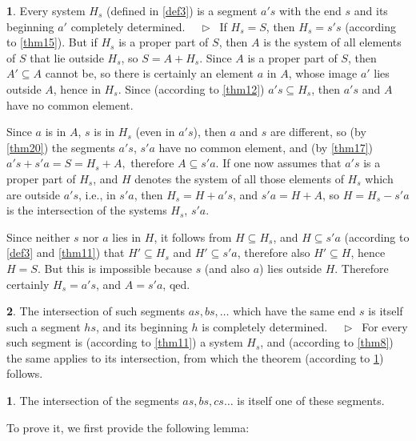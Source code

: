 \documentclass[leqno,hidelinks]{article}
\theoremstyle{definition}
\newtheorem{satz}{\protect\satzname}
\newtheorem*{zusatz}{\protect\zusatzname}
\newcommand{\satzname}{}
\newcommand{\zusatzname}{}
\renewcommand{\satzname}{\hspace{-4pt}.\ Satz}%
\renewcommand{\zusatzname}{Zusatz}%
\renewcommand{\satzname}{\hspace{-4pt}.\ Theorem}%
\renewcommand{\zusatzname}{Corollary}%
\newcommand\Beweis{\medskip \newline $ \phantom{'.'} \rhd \ $}%
\newcommand{\partof}{\subseteq}
\newcommand{\sref}[1]{\underline{\ref{#1}}}%
\begin{document}
\begin{paracol}{2}
\begin{satz}\label{thm27}
Every system $H_s$ (defined in \sref{def3}) is a segment $a's$ with the end $s$
and its beginning $a'$ completely determined.
\Beweis
If $H_s= S$, then $H_s= s's$ (according to \sref{thm15}).
But if $H_s$ is a proper part of $S$, then $A$ is the system of all elements
of $S$ that lie outside $H_s$, so $S=A+H_s$. Since $A$ is a proper part of $S$,
then $A' \partof A$ cannot be, so there is certainly an element $a$ in $A$, whose
image $a'$ lies outside $A$, hence in $H_s$. Since (according to \sref{thm12})
$a's \partof H_s$, then $a's$ and $A$ have no common element.

Since $a$ is in $A$, $s$ is in $H_s$ (even in $a's$), then $a$ and $s$ are
different, so (by \sref{thm20}) the segments $a's$, $s'a$ have no common element,
and (by \sref{thm17}) $a's+  s'a=S=H_s+ A,$ therefore $A \partof s'a$.
If one now assumes that $a's$ is a proper part of $H_s$, and $H$ denotes the
system of all those elements of $H_s$ which are outside $a's$, i.e., in $s'a$,
then $H_s = H+a's$, and $s'a = H + A$, so $H=H_s-s'a$ is the intersection of the
systems $H_s$, $s'a$.

Since neither $s$ nor $a$ lies in $H$, it follows from $H \partof H_s$, and
$H \partof s'a$ (according to \sref{def3} and \sref{thm11}) that $H' \partof H_s$
and $H' \partof s'a$, therefore also $H' \partof H$, hence $H = S$. But this is
impossible because $s$ (and also $a$) lies outside $H$. Therefore certainly
$H_s = a's$, and $A = s'a$, qed.
\end{satz}

\newpage

\begin{satz}\label{thm28}
The intersection of such segments $as, bs, \ldots$ which have the same end $s$ is
itself such a segment $hs$, and its beginning $h$ is completely determined.
\Beweis
For every such segment is (according to \sref{thm11}) a system $H_s$, and
(according to \sref{thm8}) the same applies to its intersection, from which the
theorem (according to \sref{thm27}) follows.
\end{satz}

\begin{zusatz} \label{cor_to_thm28}
The intersection of the segments $as, bs, cs \ldots$ is itself one of these segments.
\end{zusatz}

To prove it, we first provide the following lemma:


\end{paracol}
\end{document}
